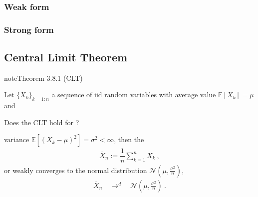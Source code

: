 \documentclass[letterpaper,10pt,english]{jupyterBook}
\begin{document}
\subsubsection{Weak form}
\label{\detokenize{ch/prob/iid:weak-form}}\label{\detokenize{ch/prob/iid:prob-iid-large-numbers-weak}}
\sphinxAtStartPar
{}


\subsubsection{Strong form}
\label{\detokenize{ch/prob/iid:strong-form}}\label{\detokenize{ch/prob/iid:prob-iid-large-numbers-strong}}
\sphinxAtStartPar
{}


\subsection{Central Limit Theorem}
\label{\detokenize{ch/prob/iid:central-limit-theorem}}\label{\detokenize{ch/prob/iid:prob-iid-clt}}\label{ch/prob/iid:thm:clt}
\begin{sphinxadmonition}{note}{Theorem 3.8.1 (CLT)}



\sphinxAtStartPar
Let \(\{ X_k \}_{k=1:n}\) a sequence of iid random variables with average value \(\mathbb{E}[X_k] = \mu\) and %
\begin{footnote}[1]\sphinxAtStartFootnote
Does the CLT hold for {\hyperref[\detokenize{ch/prob/heavy-tailed:prob-heavy-tailed}]{}}?
%
\end{footnote} variance \(\mathbb{E}[(X_k-\mu)^2] = \sigma^2 < \infty\), then the 
\begin{equation*}
\begin{split}\overline{X}_n := \dfrac{1}{n} \sum_{k=1}^n X_k \ ,\end{split}
\end{equation*}
\sphinxAtStartPar
{\hyperref[\detokenize{ch/prob/convergence:prob-convergence-weak}]{}} \sphinxhyphen{} or weakly converges \sphinxhyphen{} to the normal distribution \(\mathscr{N}\left(\mu, \frac{\sigma^2}{n} \right)\),
\begin{equation*}
\begin{split}\overline{X}_n \quad \rightarrow^d \quad \mathscr{N}\left(\mu, \frac{\sigma^2}{n} \right) \ .\end{split}
\end{equation*}\end{sphinxadmonition}
\end{document}
